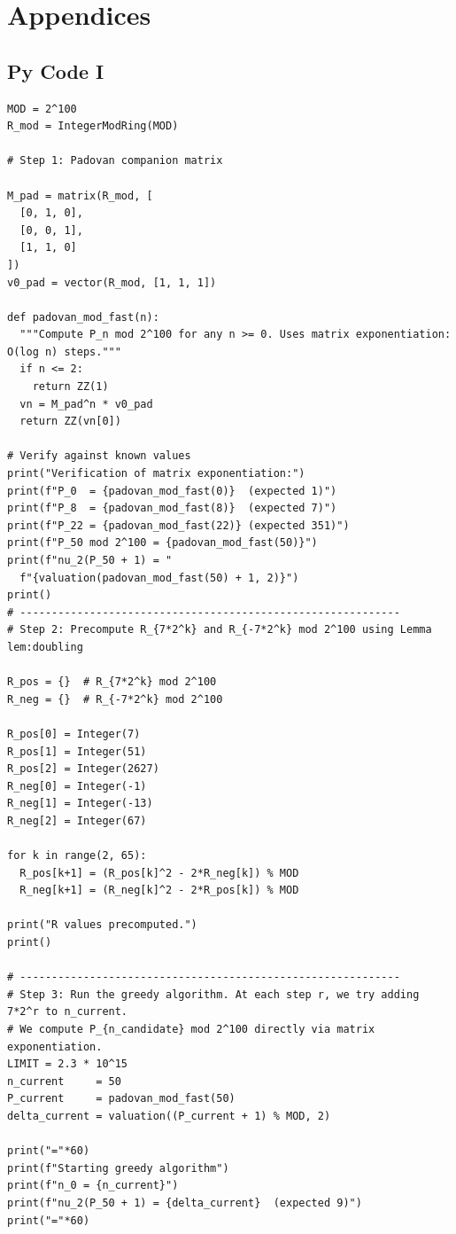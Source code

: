 \documentclass[11pt,a4paper]{article}
\numberwithin{equation}{section}
\numberwithin{table}{section}
\numberwithin{figure}{section}
\begin{document}
 \section{Appendices}
 \subsection{Py Code I}\label{app1}
 \begin{verbatim}
MOD = 2^100
R_mod = IntegerModRing(MOD)

# Step 1: Padovan companion matrix

M_pad = matrix(R_mod, [
  [0, 1, 0],
  [0, 0, 1],
  [1, 1, 0]
])
v0_pad = vector(R_mod, [1, 1, 1])

def padovan_mod_fast(n):
  """Compute P_n mod 2^100 for any n >= 0. Uses matrix exponentiation: O(log n) steps."""
  if n <= 2:
    return ZZ(1)
  vn = M_pad^n * v0_pad
  return ZZ(vn[0])

# Verify against known values
print("Verification of matrix exponentiation:")
print(f"P_0  = {padovan_mod_fast(0)}  (expected 1)")
print(f"P_8  = {padovan_mod_fast(8)}  (expected 7)")
print(f"P_22 = {padovan_mod_fast(22)} (expected 351)")
print(f"P_50 mod 2^100 = {padovan_mod_fast(50)}")
print(f"nu_2(P_50 + 1) = "
  f"{valuation(padovan_mod_fast(50) + 1, 2)}")
print()
# ------------------------------------------------------------
# Step 2: Precompute R_{7*2^k} and R_{-7*2^k} mod 2^100 using Lemma lem:doubling 

R_pos = {}  # R_{7*2^k} mod 2^100
R_neg = {}  # R_{-7*2^k} mod 2^100

R_pos[0] = Integer(7)
R_pos[1] = Integer(51)
R_pos[2] = Integer(2627)
R_neg[0] = Integer(-1)
R_neg[1] = Integer(-13)
R_neg[2] = Integer(67)

for k in range(2, 65):
  R_pos[k+1] = (R_pos[k]^2 - 2*R_neg[k]) % MOD
  R_neg[k+1] = (R_neg[k]^2 - 2*R_pos[k]) % MOD

print("R values precomputed.")
print()

# ------------------------------------------------------------
# Step 3: Run the greedy algorithm. At each step r, we try adding 7*2^r to n_current.
# We compute P_{n_candidate} mod 2^100 directly via matrix exponentiation.
LIMIT = 2.3 * 10^15
n_current     = 50
P_current     = padovan_mod_fast(50)
delta_current = valuation((P_current + 1) % MOD, 2)

print("="*60)
print(f"Starting greedy algorithm")
print(f"n_0 = {n_current}")
print(f"nu_2(P_50 + 1) = {delta_current}  (expected 9)")
print("="*60)


\end{verbatim}
\end{document}
